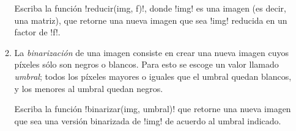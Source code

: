 \documentclass[legalpaper, 11pt,spanish]{article}
\begin{document}
\begin{enumerate}[font=\Large\bfseries]
\begin{enumerate}
          Escriba la función \li!reducir(img, f)!,
          donde \li!img! es una imagen (es decir, una matriz),
          que retorne una nueva imagen
          que sea \li!img! reducida en un factor de \li!f!.

        \item
          La \emph{binarización} de una imagen
          consiste en crear una nueva imagen cuyos píxeles sólo son negros o blancos.
          Para esto se escoge un valor llamado \emph{umbral};
          todos los píxeles mayores o iguales que el umbral quedan blancos,
          y los menores al umbral quedan negros.

          Escriba la función \li!binarizar(img, umbral)!
          que retorne una nueva imagen
          que sea una versión binarizada de \li!img! de acuerdo al umbral indicado.
      \end{enumerate}

  \end{enumerate}
\end{document}
